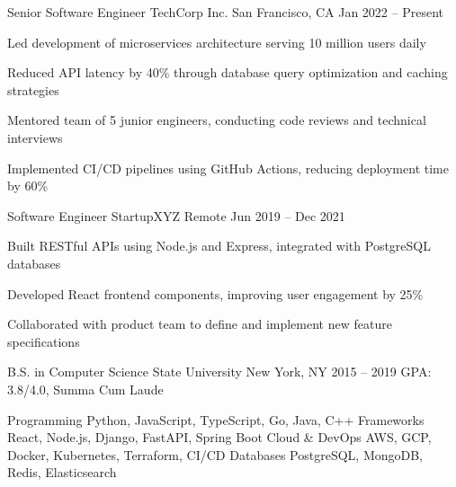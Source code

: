 \documentclass[11pt, a4paper]{awesome-cv}
\begin{document}
\makecvheader


\begin{cventries}
  \cventry
    {Senior Software Engineer}
    {TechCorp Inc.}
    {San Francisco, CA}
    {Jan 2022 -- Present}
    {
      \begin{cvitems}
        \item {Led development of microservices architecture serving 10 million users daily}
        \item {Reduced API latency by 40\% through database query optimization and caching strategies}
        \item {Mentored team of 5 junior engineers, conducting code reviews and technical interviews}
        \item {Implemented CI/CD pipelines using GitHub Actions, reducing deployment time by 60\%}
      \end{cvitems}
    }
  \cventry
    {Software Engineer}
    {StartupXYZ}
    {Remote}
    {Jun 2019 -- Dec 2021}
    {
      \begin{cvitems}
        \item {Built RESTful APIs using Node.js and Express, integrated with PostgreSQL databases}
        \item {Developed React frontend components, improving user engagement by 25\%}
        \item {Collaborated with product team to define and implement new feature specifications}
      \end{cvitems}
    }
\end{cventries}


\begin{cventries}
  \cventry
    {B.S. in Computer Science}
    {State University}
    {New York, NY}
    {2015 -- 2019}
    {GPA: 3.8/4.0, Summa Cum Laude}
\end{cventries}


\begin{cvskills}
  \cvskill
    {Programming}
    {Python, JavaScript, TypeScript, Go, Java, C++}
  \cvskill
    {Frameworks}
    {React, Node.js, Django, FastAPI, Spring Boot}
  \cvskill
    {Cloud \& DevOps}
    {AWS, GCP, Docker, Kubernetes, Terraform, CI/CD}
  \cvskill
    {Databases}
    {PostgreSQL, MongoDB, Redis, Elasticsearch}
\end{cvskills}
\end{document}
